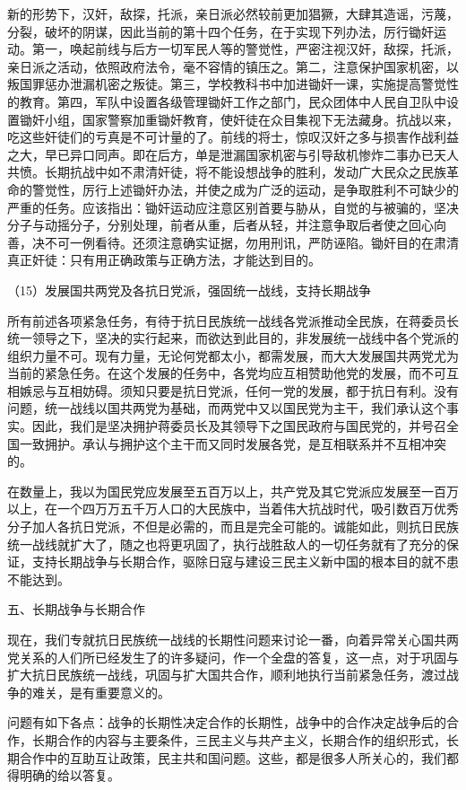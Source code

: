 \documentclass[UTF8, 12pt, a4paper]{ctexrep}
\begin{document}
新的形势下，汉奸，敌探，托派，亲日派必然较前更加猖獗，大肆其造谣，污蔑，分裂，破坏的阴谋，因此当前的第十四个任务，在于实现下列办法，厉行锄奸运动。第一，唤起前线与后方一切军民人等的警觉性，严密注视汉奸，敌探，托派，亲日派之活动，依照政府法令，毫不容情的镇压之。第二，注意保护国家机密，以叛国罪惩办泄漏机密之叛徒。第三，学校教科书中加进锄奸一课，实施提高警觉性的教育。第四，军队中设置各级管理锄奸工作之部门，民众团体中人民自卫队中设置锄奸小组，国家警察加重锄奸教育，使奸徒在众目集视下无法藏身。抗战以来，吃这些奸徒们的亏真是不可计量的了。前线的将士，惊叹汉奸之多与损害作战利益之大，早已异口同声。即在后方，单是泄漏国家机密与引导敌机惨炸二事办已天人共愤。长期抗战中如不肃清奸徒，将不能设想战争的胜利，发动广大民众之民族革命的警觉性，厉行上述锄奸办法，并使之成为广泛的运动，是争取胜利不可缺少的严重的任务。应该指出：锄奸运动应注意区别首要与胁从，自觉的与被骗的，坚决分子与动摇分子，分别处理，前者从重，后者从轻，并注意争取后者使之回心向善，决不可一例看待。还须注意确实证据，勿用刑讯，严防诬陷。锄奸目的在肃清真正奸徒：只有用正确政策与正确方法，才能达到目的。

（15）发展国共两党及各抗日党派，强固统一战线，支持长期战争

所有前述各项紧急任务，有待于抗日民族统一战线各党派推动全民族，在蒋委员长统一领导之下，坚决的实行起来，而欲达到此目的，非发展统一战线中各个党派的组织力量不可。现有力量，无论何党都太小，都需发展，而大大发展国共两党尤为当前的紧急任务。在这个发展的任务中，各党均应互相赞助他党的发展，而不可互相嫉忌与互相妨碍。须知只要是抗日党派，任何一党的发展，都于抗日有利。没有问题，统一战线以国共两党为基础，而两党中又以国民党为主干，我们承认这个事实。因此，我们是坚决拥护蒋委员长及其领导下之国民政府与国民党的，并号召全国一致拥护。承认与拥护这个主干而又同时发展各党，是互相联系并不互相冲突的。

在数量上，我以为国民党应发展至五百万以上，共产党及其它党派应发展至一百万以上，在一个四万万五千万人口的大民族中，当着伟大抗战时代，吸引数百万优秀分子加人各抗日党派，不但是必需的，而且是完全可能的。诚能如此，则抗日民族统一战线就扩大了，随之也将更巩固了，执行战胜敌人的一切任务就有了充分的保证，支持长期战争与长期合作，驱除日寇与建设三民主义新中国的根本目的就不患不能达到。

五、长期战争与长期合作

现在，我们专就抗日民族统一战线的长期性问题来讨论一番，向着异常关心国共两党关系的人们所已经发生了的许多疑问，作一个全盘的答复，这一点，对于巩固与扩大抗日民族统一战线，巩固与扩大国共合作，顺利地执行当前紧急任务，渡过战争的难关，是有重要意义的。

问题有如下各点：战争的长期性决定合作的长期性，战争中的合作决定战争后的合作，长期合作的内容与主要条件，三民主义与共产主义，长期合作的组织形式，长期合作中的互助互让政策，民主共和国问题。这些，都是很多人所关心的，我们都得明确的给以答复。
\end{document}
